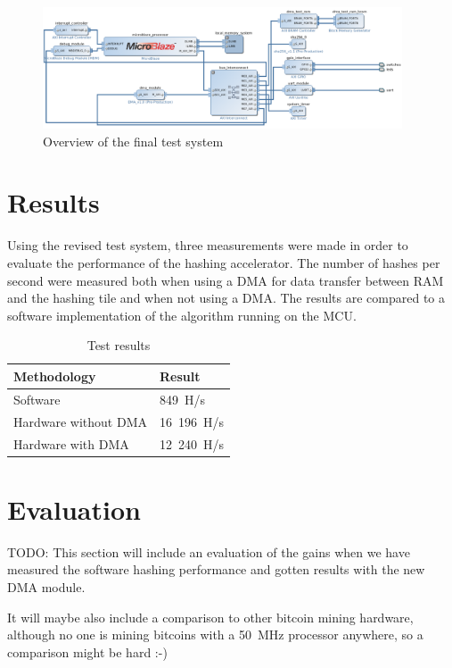 \begin{figure}
	\includegraphics[width=0.95\textwidth]{Figures/testsystem-vivado-final.png}
	\caption{Overview of the final test system}
	\label{fig:testsystem-vivado-final}
\end{figure}

\section{Results}

Using the revised test system, three measurements were made in order to evaluate the
performance of the hashing accelerator. The number of hashes per second were measured
both when using a DMA for data transfer between RAM and the hashing tile and when not
using a DMA. The results are compared to a software implementation of the algorithm
running on the MCU.

\begin{table}[ht]
	\centering
	\begin{tabular}{|l|l|}
		\hline
		\textbf{Methodology} & \textbf{Result} \\
		\hline
		Software & 849~H/s \\
		Hardware without DMA & 16~196~H/s\\
		Hardware with DMA & 12~240~H/s\\
		\hline
	\end{tabular}

	\caption{Test results}
\end{table}

\section{Evaluation}

TODO:
This section will include an evaluation of the gains when we have measured the software
hashing performance and gotten results with the new DMA module.

It will maybe also include a comparison to other bitcoin mining hardware, although
no one is mining bitcoins with a 50~MHz processor anywhere, so a comparison might
be hard :-)

